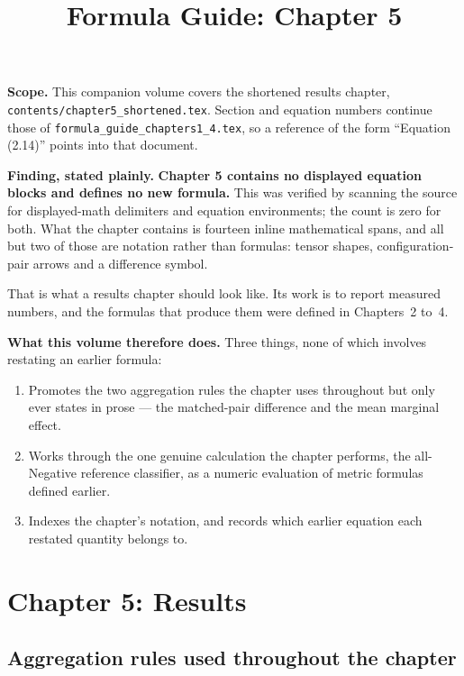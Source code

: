 \documentclass[11pt,a4paper]{article}
\title{Formula Guide: Chapter 5}
\author{}
\date{}
\numberwithin{equation}{section}
\begin{document}
\maketitle

\textbf{Scope.} This companion volume covers the shortened results chapter,
\texttt{contents/chapter5\_shortened.tex}. Section and equation numbers
continue those of \texttt{formula\_guide\_chapters1\_4.tex}, so a reference of
the form ``Equation (2.14)'' points into that document.

\textbf{Finding, stated plainly.} \textbf{Chapter 5 contains no displayed
equation blocks and defines no new formula.} This was verified by scanning the
source for displayed-math delimiters and equation environments; the count is
zero for both. What the chapter contains is fourteen inline mathematical
spans, and all but two of those are notation rather than formulas: tensor
shapes, configuration-pair arrows and a difference symbol.

That is what a results chapter should look like. Its work is to report
measured numbers, and the formulas that produce them were defined in
Chapters~2 to~4.

\textbf{What this volume therefore does.} Three things, none of which involves
restating an earlier formula:

\begin{enumerate}
	\item Promotes the two aggregation rules the chapter uses throughout but
	only ever states in prose --- the matched-pair difference and the mean
	marginal effect.
	\item Works through the one genuine calculation the chapter performs, the
	all-Negative reference classifier, as a numeric evaluation of metric
	formulas defined earlier.
	\item Indexes the chapter's notation, and records which earlier equation
	each restated quantity belongs to.
\end{enumerate}

\tableofcontents
\clearpage

\setcounter{section}{4}
\section{Chapter 5: Results}
\label{fg5:chapter5}

\subsection{Aggregation rules used throughout the chapter}
\end{document}

